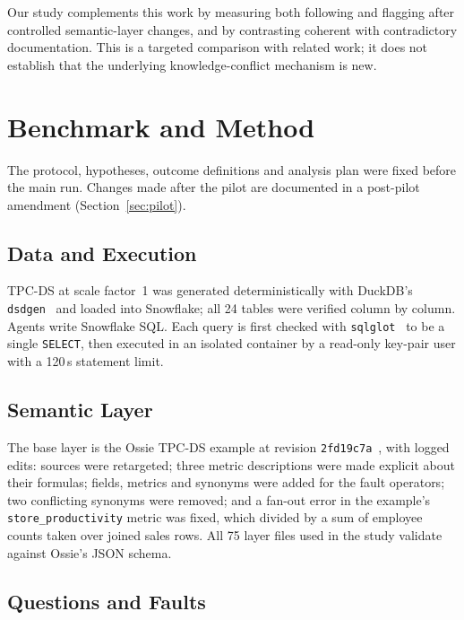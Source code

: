 \documentclass[conference]{IEEEtran}
\newcommand{\id}[1]{\texttt{#1}}
\begin{document}
Our study complements this work by measuring both following and flagging after controlled semantic-layer changes, and by contrasting coherent with contradictory documentation. This is a targeted comparison with related work; it does not establish that the underlying knowledge-conflict mechanism is new.

\section{Benchmark and Method}

The protocol, hypotheses, outcome definitions and analysis plan were fixed before the main run. Changes made after the pilot are documented in a post-pilot amendment (Section~\ref{sec:pilot}).

\subsection{Data and Execution}

TPC-DS at scale factor~1 was generated deterministically with DuckDB's \id{dsdgen}~\cite{duckdb} and loaded into Snowflake; all 24 tables were verified column by column. Agents write Snowflake SQL. Each query is first checked with \id{sqlglot}~\cite{sqlglot} to be a single \id{SELECT}, then executed in an isolated container by a read-only key-pair user with a 120\,s statement limit.

\subsection{Semantic Layer}

The base layer is the Ossie TPC-DS example at revision \id{2fd19c7a}~\cite{ossie}, with logged edits: sources were retargeted; three metric descriptions were made explicit about their formulas; fields, metrics and synonyms were added for the fault operators; two conflicting synonyms were removed; and a fan-out error in the example's \id{store\_productivity} metric was fixed, which divided by a sum of employee counts taken over joined sales rows. All 75 layer files used in the study validate against Ossie's JSON schema.

\subsection{Questions and Faults}
\end{document}
